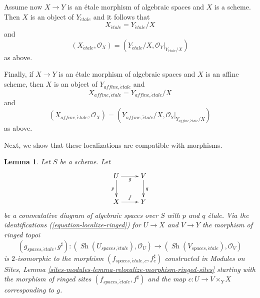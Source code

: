 \documentclass{stacks-project}
\theoremstyle{plain}
\newtheorem{lemma}[subsection]{Lemma}
\theoremstyle{definition}
\theoremstyle{remark}
\numberwithin{equation}{subsection}
\def\Sh{\mathop{\mathit{Sh}}\nolimits}
\def\etale{{\acute{e}tale}}
\begin{document}
\medskip\noindent
Assume now $X \to Y$ is an \'etale morphism of algebraic spaces and $X$ is
a scheme. Then $X$ is an object of $Y_\etale$ and it follows that
\begin{equation}
\label{equation-localize-at-scheme}
X_\etale = Y_\etale/X
\end{equation}
and
\begin{equation}
\label{equation-localize-at-scheme-ringed}
(X_\etale, \mathcal{O}_X) =
(Y_\etale/X, \mathcal{O}_Y|_{Y_\etale/X})
\end{equation}
as above.

\medskip\noindent
Finally, if $X \to Y$ is an \'etale morphism of algebraic spaces and $X$ is
an affine scheme, then $X$ is an object of $Y_{affine, \etale}$ and
\begin{equation}
\label{equation-localize-at-affine}
X_{affine, \etale} = Y_{affine, \etale}/X
\end{equation}
and
\begin{equation}
\label{equation-localize-at-affine-ringed}
(X_{affine, \etale}, \mathcal{O}_X) =
(Y_{affine, \etale}/X, \mathcal{O}_Y|_{Y_{affine, \etale}/X})
\end{equation}
as above.

\medskip\noindent
Next, we show that these localizations are compatible with morphisms.

\begin{lemma}
\label{lemma-relocalize-morphism}
Let $S$ be a scheme. Let
$$
\xymatrix{
U \ar[d]_p \ar[r]_g & V \ar[d]^q \\
X \ar[r]^f & Y
}
$$
be a commutative diagram of algebraic spaces over $S$ with $p$ and $q$ \'etale.
Via the identifications
(\ref{equation-localize-ringed}) for $U \to X$ and $V \to Y$
the morphism of ringed topoi
$$
(g_{spaces, \etale}, g^\sharp) :
(\Sh(U_{spaces, \etale}), \mathcal{O}_U)
\longrightarrow
(\Sh(V_{spaces, \etale}), \mathcal{O}_V)
$$
is $2$-isomorphic to the morphism $(f_{spaces, \etale, c}, f_c^\sharp)$
constructed in
Modules on Sites,
Lemma \ref{sites-modules-lemma-relocalize-morphism-ringed-sites}
starting with the morphism of ringed sites
$(f_{spaces, \etale}, f^\sharp)$ and
the map $c : U \to V \times_Y X$ corresponding to $g$.
\end{lemma}
\end{document}
